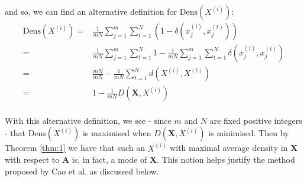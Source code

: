 and so, we can find an alternative definition for \(\text{Dens}(X^{(i)})\):
\begin{equation}
\begin{aligned}
    \text{Dens}(X^{(i)}) = {} & {} \frac{1}{mN} \sum_{j=1}^m \sum_{t=1}^N 
                         (1 - \delta(x_j^{(i)}, x_j^{(t)}))
    \\
			             = {} & {} \frac{1}{mN} \sum_{j=1}^m \sum_{t=1}^N 1 - 
                         \frac{1}{mN} \sum_{j=1}^m \sum_{t=1}^N 
                         \delta(x_j^{(i)}, x_j^{(t)})
    \\
                         = {} & {} \frac{mN}{mN} - \frac{1}{mN} \sum_{t=1}^N 
                         d(X^{(i)}, X^{(t)})
    \\
			             = {} & {} 1 - \frac{1}{mN} D(\textbf{X}, X^{(i)})
\end{aligned}
\end{equation}\\

With this alternative definition, we see - since \(m\) and \(N\) are fixed 
positive integers - that \(\text{Dens}(X^{(i)})\) is maximised when 
\(D(\textbf{X}, X^{(i)})\) is minimised. Then by Theorem \ref{thm:1} we have
that such an \(X^{(i)}\) with maximal average density in \textbf{X} with respect
to \textbf{A} is, in fact, a mode of \textbf{X}. This notion helps justify the 
method proposed by Cao et al. as discussed below.\\

